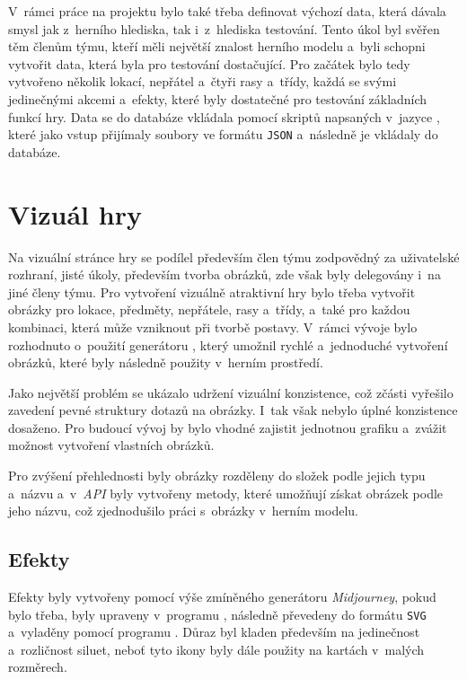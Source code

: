 V~rámci práce na projektu bylo také třeba definovat výchozí data, která dávala smysl jak z~herního hlediska, tak i~z~hlediska testování. Tento úkol byl svěřen těm členům týmu, kteří měli největší znalost herního modelu a~byli schopni vytvořit data, která byla pro testování dostačující. Pro začátek bylo tedy vytvořeno několik lokací, nepřátel a~čtyři rasy a~třídy, každá se svými jedinečnými akcemi a~efekty, které byly dostatečné pro testování základních funkcí hry. Data se do databáze vkládala pomocí skriptů napsaných v~jazyce , které jako vstup přijímaly soubory ve formátu \texttt{JSON} a~následně je vkládaly do databáze.

\section{Vizuál hry}
\label{subsec:game_visuals}

Na vizuální stránce hry se podílel především člen týmu zodpovědný za uživatelské rozhraní, jisté úkoly, především tvorba obrázků, zde však byly delegovány i~na jiné členy týmu. Pro vytvoření vizuálně atraktivní hry bylo třeba vytvořit obrázky pro lokace, předměty, nepřátele, rasy a~třídy, a~také pro každou kombinaci, která může vzniknout při tvorbě postavy. V~rámci vývoje bylo rozhodnuto o~použití generátoru , který umožnil rychlé a~jednoduché vytvoření obrázků, které byly následně použity v~herním prostředí.

Jako největší problém se ukázalo udržení vizuální konzistence, což zčásti vyřešilo zavedení pevné struktury dotazů na obrázky. I~tak však nebylo úplné konzistence dosaženo. Pro budoucí vývoj by bylo vhodné zajistit jednotnou grafiku a~zvážit možnost vytvoření vlastních obrázků.

Pro zvýšení přehlednosti byly obrázky rozděleny do složek podle jejich typu a~názvu a~v~\textit{API} byly vytvořeny metody, které umožňují získat obrázek podle jeho názvu, což zjednodušilo práci s~obrázky v~herním modelu.

\subsection{Efekty}
\label{subsec:effects}

Efekty  byly vytvořeny pomocí výše zmíněného generátoru \textit{Midjourney}, pokud bylo třeba, byly upraveny v~programu , následně převedeny do formátu \texttt{SVG} a~vyladěny pomocí programu . Důraz byl kladen především na jedinečnost a~rozličnost siluet, neboť tyto ikony byly dále použity na kartách v~malých rozměrech.

